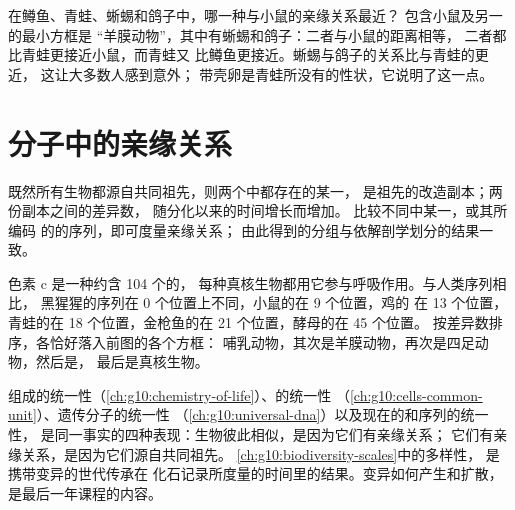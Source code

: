 \begin{example}[读懂方框]\label{ex:g10:common-ancestry:reading}
在鳟鱼、青蛙、蜥蜴和鸽子中，哪一种与小鼠的亲缘关系最近？
包含小鼠及另一的最小方框是
“羊膜动物”，其中有蜥蜴和鸽子：二者与小鼠的距离相等，
二者都比青蛙更接近小鼠，而青蛙又
比鳟鱼更接近。蜥蜴与鸽子的关系比与青蛙的更近，
这让大多数人感到意外；
带壳卵是青蛙所没有的性状，它说明了这一点。
\end{example}

\section{分子中的亲缘关系}

\begin{proposition}[分子亲缘关系]\label{prop:g10:common-ancestry:molecular}
既然所有生物都源自共同祖先，则两个中都存在的某一，
是祖先的改造副本；两份副本之间的差异数，
随分化以来的时间增长而增加。
比较不同中某一，或其所编码
的的序列，即可度量亲缘关系；
由此得到的分组与依解剖学划分的结果一致。
\end{proposition}
\admitted

\begin{example}[细胞色素 c]\label{ex:g10:common-ancestry:cytochrome}
色素 c 是一种约含 104 个的，
每种真核生物都用它参与呼吸作用。与人类序列相比，
黑猩猩的序列在 0 个位置上不同，小鼠的在 9 个位置，鸡的
在 13 个位置，青蛙的在 18 个位置，金枪鱼的在 21 个位置，酵母的在 45 个位置。
按差异数排序，各恰好落入前图的各个方框：
哺乳动物，其次是羊膜动物，再次是四足动物，然后是，
最后是真核生物。
\end{example}

\begin{remark}[统一性与亲缘关系]\label{rem:g10:common-ancestry:unity}
组成的统一性（\cref{ch:g10:chemistry-of-life}）、的统一性
（\cref{ch:g10:cells-common-unit}）、遗传分子的统一性
（\cref{ch:g10:universal-dna}）以及现在的和序列的统一性，
是同一事实的四种表现：生物彼此相似，是因为它们有亲缘关系；
它们有亲缘关系，是因为它们源自共同祖先。
\cref{ch:g10:biodiversity-scales}中的多样性，
是携带变异的世代传承在
化石记录所度量的时间里的结果。变异如何产生和扩散，
是最后一年课程的内容。
\end{remark}

